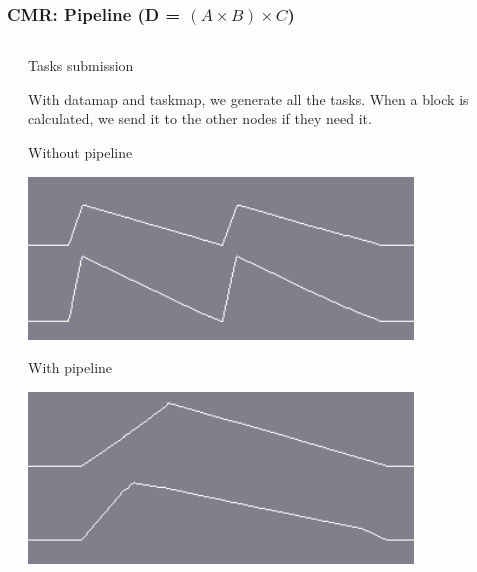 \documentclass{beamer}
\begin{document}
\begin{frame}
    \frametitle{CMR: Pipeline (D = $(A \times B) \times C$)}
    \begin{columns}[T]
        \begin{column}{0.5\textwidth}  %

            \begin{center}
                
            \end{center}

        \end{column}
        \begin{column}{0.5\textwidth}
            Tasks submission
            \begin{minipage}[t][.2\textheight]{\textwidth}
                With datamap and taskmap, we generate all the tasks. When a block is calculated, we send it to the other nodes if they need it.
            \end{minipage} \par
            \begin{minipage}[t][.33\textheight]{\textwidth}
                Without pipeline
                \begin{center}
                    \includegraphics[width=0.8\textwidth]{figures/no-pipeline_submit.png}
                \end{center}
            \end{minipage}\par
            \begin{minipage}[t][.33\textheight]{\textwidth}
                With pipeline
                \begin{center}
                    \includegraphics[width=0.8\textwidth]{figures/pipeline_submit.png}
                \end{center}
            \end{minipage}
        \end{column}
    \end{columns}
\end{frame}
\end{document}
